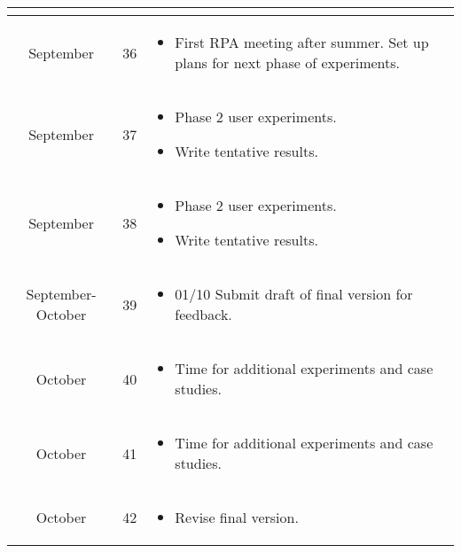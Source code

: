\begin{longtable}{| c | c | m{10cm} |}
\begin{itemize}
                                \end{itemize}\\
        \hline
        September & 36 &\begin{itemize}
                                \item First RPA meeting after summer. Set up plans for next phase of experiments.
                        \end{itemize}\\
        \hline
        September & 37 & \begin{itemize}
                                \item Phase 2 user experiments.
                                \item Write tentative results.
                            \end{itemize}\\
        \hline
        September & 38 & \begin{itemize}
                                \item Phase 2 user experiments.
                                \item Write tentative results.
                        \end{itemize}\\
        \hline
        September-October & 39 &\begin{itemize}
                                    \item 01/10 Submit draft of final version for feedback.
                                \end{itemize}\\
        \hline
        October & 40 & \begin{itemize}
                            \item Time for additional experiments and case studies.
                        \end{itemize}\\
        \hline
        October & 41 & \begin{itemize}
                                \item Time for additional experiments and case studies.
                        \end{itemize}\\
        \hline
        October & 42 & \begin{itemize}
                            \item Revise final version.
                        \end{itemize}\\

\end{longtable}
